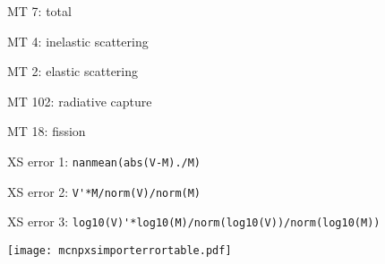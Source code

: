\documentclass[letterpaper,12pt]{article}
\begin{document}
MT 7: total 

MT 4: inelastic scattering 

MT 2: elastic scattering 

MT 102: radiative capture 

MT 18: fission

XS error 1: \verb|nanmean(abs(V-M)./M)|

XS error 2: \verb|V'*M/norm(V)/norm(M)|

XS error 3: \verb|log10(V)'*log10(M)/norm(log10(V))/norm(log10(M))|

\texttt{[image: mcnpxsimporterrortable.pdf]}
\end{document}
